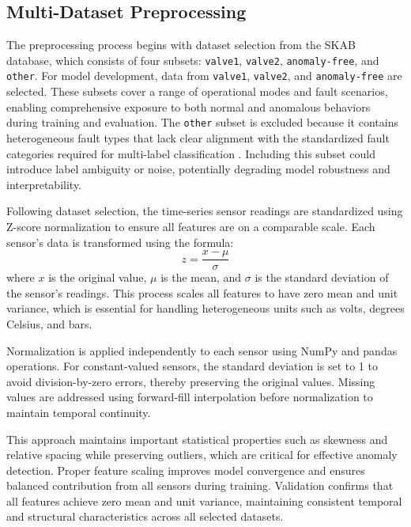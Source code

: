 \subsection*{Multi-Dataset Preprocessing}

The preprocessing process begins with dataset selection from the SKAB database, which consists of four subsets: \texttt{valve1}, \texttt{valve2}, \texttt{anomaly-free}, and \texttt{other}. For model development, data from \texttt{valve1}, \texttt{valve2}, and \texttt{anomaly-free} are selected. These subsets cover a range of operational modes and fault scenarios, enabling comprehensive exposure to both normal and anomalous behaviors during training and evaluation. The \texttt{other} subset is excluded because it contains heterogeneous fault types that lack clear alignment with the standardized fault categories required for multi-label classification \cite{hu2025bi}. Including this subset could introduce label ambiguity or noise, potentially degrading model robustness and interpretability.

Following dataset selection, the time-series sensor readings are standardized using Z-score normalization to ensure all features are on a comparable scale. Each sensor's data is transformed using the formula:
\begin{equation}
z = \frac{x - \mu}{\sigma}
\label{eq:zscore}
\end{equation}
where $x$ is the original value, $\mu$ is the mean, and $\sigma$ is the standard deviation of the sensor's readings. This process scales all features to have zero mean and unit variance, which is essential for handling heterogeneous units such as volts, degrees Celsius, and bars.

Normalization is applied independently to each sensor using NumPy and pandas operations. For constant-valued sensors, the standard deviation is set to 1 to avoid division-by-zero errors, thereby preserving the original values. Missing values are addressed using forward-fill interpolation before normalization to maintain temporal continuity.

This approach maintains important statistical properties such as skewness and relative spacing while preserving outliers, which are critical for effective anomaly detection. Proper feature scaling improves model convergence and ensures balanced contribution from all sensors during training. Validation confirms that all features achieve zero mean and unit variance, maintaining consistent temporal and structural characteristics across all selected datasets. 